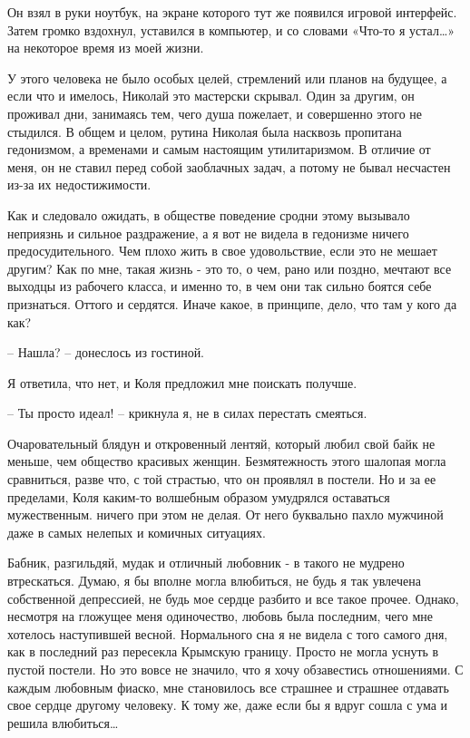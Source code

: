 \documentclass[
]{book}
\begin{document}
Он взял в руки ноутбук, на экране которого тут же появился игровой интерфейс. Затем громко вздохнул, уставился в компьютер, и со словами «Что-то я устал\ldots» на некоторое время из моей жизни.

У этого человека не было особых целей, стремлений или планов на будущее, а если что и имелось, Николай это мастерски скрывал. Один за другим, он проживал дни, занимаясь тем, чего душа пожелает, и совершенно этого не стыдился. В общем и целом, рутина Николая была насквозь пропитана гедонизмом, а временами и самым настоящим утилитаризмом. В отличие от меня, он не ставил перед собой заоблачных задач, а потому не бывал несчастен из-за их недостижимости.

Как и следовало ожидать, в обществе поведение сродни этому вызывало неприязнь и сильное раздражение, а я вот не видела в гедонизме ничего предосудительного. Чем плохо жить в свое удовольствие, если это не мешает другим? Как по мне, такая жизнь - это то, о чем, рано или поздно, мечтают все выходцы из рабочего класса, и именно то, в чем они так сильно боятся себе признаться. Оттого и сердятся. Иначе какое, в принципе, дело, что там у кого да как?

-- Нашла? -- донеслось из гостиной.

Я ответила, что нет, и Коля предложил мне поискать получше.

-- Ты просто идеал! -- крикнула я, не в силах перестать смеяться.

Очаровательный блядун и откровенный лентяй, который любил свой байк не меньше, чем общество красивых женщин. Безмятежность этого шалопая могла сравниться, разве что, с той страстью, что он проявлял в постели. Но и за ее пределами, Коля каким-то волшебным образом умудрялся оставаться мужественным. ничего при этом не делая. От него буквально пахло мужчиной даже в самых нелепых и комичных ситуациях.

Бабник, разгильдяй, мудак и отличный любовник - в такого не мудрено втрескаться. Думаю, я бы вполне могла влюбиться, не будь я так увлечена собственной депрессией, не будь мое сердце разбито и все такое прочее. Однако, несмотря на гложущее меня одиночество, любовь была последним, чего мне хотелось наступившей весной. Нормального сна я не видела с того самого дня, как в последний раз пересекла Крымскую границу. Просто не могла уснуть в пустой постели. Но это вовсе не значило, что я хочу обзавестись отношениями. С каждым любовным фиаско, мне становилось все страшнее и страшнее отдавать свое сердце другому человеку. К тому же, даже если бы я вдруг сошла с ума и решила влюбиться\ldots{}
\end{document}
